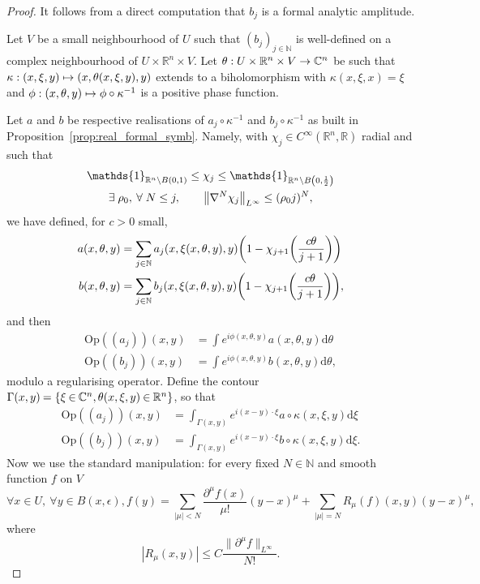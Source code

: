 \documentclass[AHL,Unicode,longabstracts,published]{cedram}
\newcommand{\Opp}{\mathrm{Op}}
\newcommand\1{\mathds{1}}
\newcommand{\R}{\mathbb{R}}
\newcommand{\C}{\mathbb{C}}
\newcommand{\N}{\mathbb{N}}
\newcommand{\dd}{\mathrm{d}}
\newcommand*{\mk}{\mkern -1mu}
\let\oldexists\exists
\renewcommand*{\exists}{\mathrel{\oldexists}}
\let\oldforall\forall
\renewcommand*{\forall}{\mathrel{\oldforall}}
\renewcommand*{\to}{\mathchoice{\longrightarrow}{\rightarrow}{\rightarrow}{\rightarrow}}
\let\oldmapsto\mapsto
\renewcommand*{\mapsto}{\mathchoice{\longmapsto}{\oldmapsto}{\oldmapsto}{\oldmapsto}}
\let\originalleft\left
\let\originalright\right
\renewcommand{\left}{\mathopen{}\mathclose\bgroup\originalleft}
\renewcommand{\right}{\aftergroup\egroup\originalright}
\begin{document}
\begin{proof}
It follows from a direct computation that $b_j$ is a formal analytic
amplitude.

Let $V$ be a small neighbourhood of $U$ such that $(b_j)_{j\in \N}$ is well-defined on a complex neighbourhood of $U\times \R^n\times V$. Let $\theta:U\times \R^n\times V\to \C^n$ be such that $\kappa:(x,\xi,y)\mapsto (x,\theta(x,\xi,y),y)$ extends to a biholomorphism with $\kappa(x,\xi,x)=\xi$ and $\phi:(x,\theta,y)\mapsto \phi\circ \kappa^{-1}$ is a positive phase function.

Let $a$ and $b$ be respective realisations of $a_j\circ \kappa^{-1}$ and $b_j\circ \kappa^{-1}$ as built in Proposition~\ref{prop:real_formal_symb}. Namely, with $\chi_j\in C^{\infty}(\R^n,\R)$ radial and such that
\begin{gather*}
\1_{\R^n\setminus B(0,1)}\leq \chi_j\leq \1_{\R^n\setminus B\left(0,\frac 12\right)}\\
\exists \rho_0,\:\forall N\leq j,\qquad
\left\|\nabla^N\chi_j\right\|_{L^{\infty}}\leq (\rho_0j)^N,
\end{gather*}
we have defined, for $c>0$ small,
\begin{align*}
a(x,\theta,y)&=\sum_{j\in
\N}a_j(x,\xi(x,\theta,y),y)\left(1-\chi_{j+1}\left(\frac{c\theta}{j+1}\right)\right)\\
b(x,\theta,y)&=\sum_{j\in
\N}b_j(x,\xi(x,\theta,y),y)\left(1-\chi_{j+1}\left(\frac{c\theta}{j+1}\right)\right),
\end{align*}
and then
\begin{align*}
\Opp((a_j))(x,y)&=\int e^{i\phi(x,\theta,y)}a(x,\theta,y)\dd \theta\\
\Opp((b_j))(x,y)&=\int e^{i\phi(x,\theta,y)}b(x,\theta,y)\dd \theta,
\end{align*}
modulo a regularising operator. Define the contour ${\Gamma(x,y)\mk=\{\xi\mk\in\mk \C^n, \theta(x,\xi,y)\mk\in \mk\R^n\}}$, so that
\begin{align*}
\Opp((a_j))(x,y)&=\int_{\Gamma(x,y)} e^{i(x-y)\cdot \xi}a\circ \kappa(x,\xi,y)\dd \xi\\
\Opp((b_j))(x,y)&=\int_{\Gamma(x,y)} e^{i(x-y)\cdot \xi}b\circ \kappa (x,\xi,y)\dd \xi.
\end{align*}
Now we use the standard manipulation: for every fixed $N\in \N$ and smooth function $f$ on $V$
\[
\forall x\in U, \:\forall y \in B(x,\epsilon), f(y)=\sum_{|\mu|< N}\frac{\partial^\mu f(x)}{\mu!}(y-x)^{\mu}+\sum_{|\mu|=N}R_\mu(f)(x,y)(y-x)^{\mu},
\]
where
\[
|R_\mu(x,y)|\leq C\frac{\|\partial^{\mu}f\|_{L^{\infty}}}{N!}.
\]
\end{proof}
\end{document}
